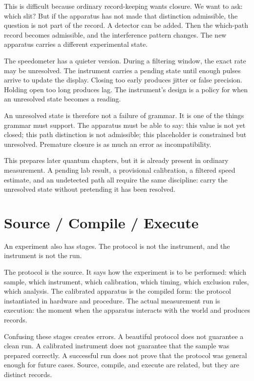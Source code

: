 This is difficult because ordinary record-keeping wants closure. We want to
ask: which slit? But if the apparatus has not made that distinction admissible,
the question is not part of the record. A detector can be added. Then the
which-path record becomes admissible, and the interference pattern changes. The
new apparatus carries a different experimental state.

The speedometer has a quieter version. During a filtering window, the exact
rate may be unresolved. The instrument carries a pending state until enough
pulses arrive to update the display. Closing too early produces jitter or false
precision. Holding open too long produces lag. The instrument's design is a
policy for when an unresolved state becomes a reading.

An unresolved state is therefore not a failure of grammar. It is one of the
things grammar must support. The apparatus must be able to say: this value is
not yet closed; this path distinction is not admissible; this placeholder is
constrained but unresolved. Premature closure is as much an error as
incompatibility.

This prepares later quantum chapters, but it is already present in ordinary
measurement. A pending lab result, a provisional calibration, a filtered speed
estimate, and an undetected path all require the same discipline: carry the
unresolved state without pretending it has been resolved.

\section{Source / Compile / Execute}
\label{se:source-compile-execute}

An experiment also has stages. The protocol is not the instrument, and the
instrument is not the run.

The protocol is the source. It says how the experiment is to be performed:
which sample, which instrument, which calibration, which timing, which
exclusion rules, which analysis. The calibrated apparatus is the compiled form:
the protocol instantiated in hardware and procedure. The actual measurement run
is execution: the moment when the apparatus interacts with the world and
produces records.

Confusing these stages creates errors. A beautiful protocol does not guarantee
a clean run. A calibrated instrument does not guarantee that the sample was
prepared correctly. A successful run does not prove that the protocol was
general enough for future cases. Source, compile, and execute are related, but
they are distinct records.

